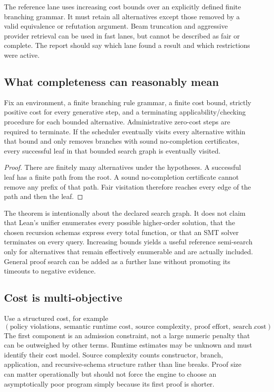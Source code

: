 The reference lane uses increasing cost bounds over an explicitly defined
finite branching grammar. It must retain all alternatives except those removed
by a valid equivalence or refutation argument. Beam truncation and aggressive
provider retrieval can be used in fast lanes, but cannot be described as fair
or complete. The report should say which lane found a result and which
restrictions were active.

\subsection{What completeness can reasonably mean}

\begin{proposition}
Fix an environment, a finite branching rule grammar, a finite cost bound, strictly positive cost for every generative step, and a
terminating applicability/checking procedure for each bounded alternative.
Administrative zero-cost steps are required to terminate.
If the scheduler eventually visits every alternative within that bound and
only removes branches with sound no-completion certificates, every successful
leaf in that bounded search graph is eventually visited.
\end{proposition}
\begin{proof}
There are finitely many alternatives under the hypotheses. A successful leaf
has a finite path from the root. A sound no-completion certificate cannot remove
any prefix of that path. Fair visitation therefore reaches every edge of the
path and then the leaf.
\end{proof}

The theorem is intentionally about the declared search graph. It does not claim
that Lean's unifier enumerates every possible higher-order solution, that the
chosen recursion schemas express every total function, or that an SMT solver
terminates on every query. Increasing bounds yields a useful reference
semi-search only for alternatives that remain effectively enumerable and are
actually included. General proof search can be added as a further lane without
promoting its timeouts to negative evidence.

\subsection{Cost is multi-objective}

Use a structured cost, for example
\[
 (\text{policy violations},\ \text{semantic runtime cost},\
   \text{source complexity},\ \text{proof effort},\ \text{search cost}).
\]
The first component is an admission constraint, not a large numeric penalty
that can be outweighed by other terms. Runtime estimates may be unknown and
must identify their cost model. Source complexity counts constructor, branch,
application, and recursive-schema structure rather than line breaks. Proof
size can matter operationally but should not force the engine to choose an
asymptotically poor program simply because its first proof is shorter.

